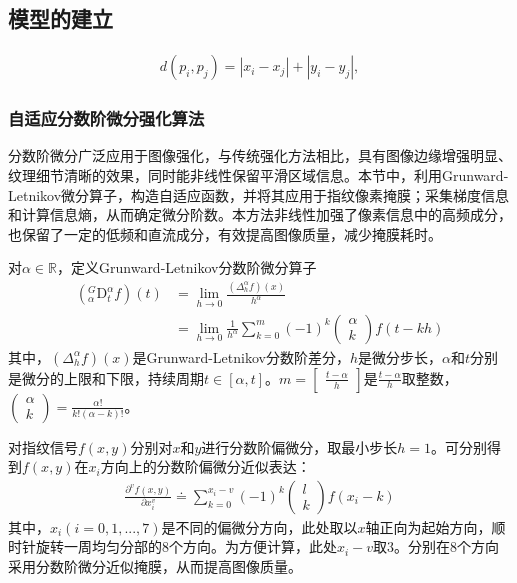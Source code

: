 \documentclass{whutmod}
\begin{document}
		\subsection{模型的建立}
			\begin{gather*}
			d(p_i,p_j)=\left | x_i-x_j \right |+\left | y_i-y_j \right | ,
			\end{gather*}
		\subsubsection{自适应分数阶微分强化算法}
		分数阶微分广泛应用于图像强化，与传统强化方法相比，具有图像边缘增强明显、纹理细节清晰的效果，同时能非线性保留平滑区域信息。本节中，利用Grunward-Letnikov微分算子，构造自适应函数，并将其应用于指纹像素掩膜；采集梯度信息和计算信息熵，从而确定微分阶数。本方法非线性加强了像素信息中的高频成分，也保留了一定的低频和直流成分，有效提高图像质量，减少掩膜耗时。
		
		对$\alpha \in\mathbb{R}$，定义Grunward-Letnikov分数阶微分算子
		\begin{align}
		 \displaystyle(_{\alpha}^{G}\textrm{D}_{t}^{\alpha}f)(t)&=\lim_{h\rightarrow 0}\frac{(\Delta _{h}^{\alpha }f)(x)}{h^{\alpha }}\\
		 &= \displaystyle\lim_{h\rightarrow 0}\frac{1}{h^{\alpha }}\sum_{k=0}^{m}(-1)^{k}\begin{pmatrix}
		\alpha \\ k
		\end{pmatrix}f(t-kh)
		\end{align}
		其中，$\displaystyle(\Delta _{h}^{\alpha }f)(x)$是Grunward-Letnikov分数阶差分，$h$是微分步长，$\alpha$和$t$分别是微分的上限和下限，持续周期$t\in [\alpha,t]$。$m=\begin{bmatrix}\displaystyle\frac{t-\alpha}{h}\end{bmatrix}$是$\displaystyle\frac{t-\alpha}{h}$取整数，
		$\displaystyle\begin{pmatrix}
		\alpha \\ k
		\end{pmatrix}=\frac{\alpha !}{k!(\alpha -k)!}$。
		
		对指纹信号$f(x,y)$分别对$x$和$y$进行分数阶偏微分，取最小步长$h=1$。可分别得到$f(x,y)$在$x_i$方向上的分数阶偏微分近似表达：
		\begin{gather}
		\displaystyle\frac{\partial^v f(x,y)}{\partial x_{i}^{v}}\doteq\displaystyle\sum_{k=0}^{x_i-v}(-1)^{k}\begin{pmatrix}
		l \\ k
		\end{pmatrix}f(x_i-k) 
		\end{gather}
		其中，$x_i(i=0,1,...,7)$是不同的偏微分方向，此处取以$x$轴正向为起始方向，顺时针旋转一周均匀分部的8个方向。为方便计算，此处$x_i-v$取$3$。分别在$8$个方向采用分数阶微分近似掩膜，从而提高图像质量。
		
\end{document}
